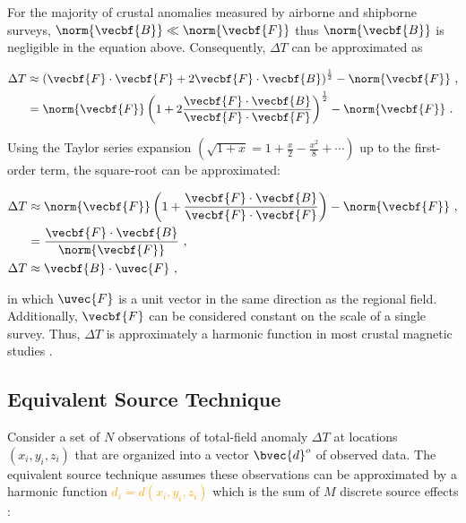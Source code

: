 \noindent
For the majority of crustal anomalies measured by airborne and shipborne surveys, $\norm{\vecbf{B}} \ll \norm{\vecbf{F}}$ thus $\norm{\vecbf{B}}$ is negligible in the equation above. Consequently, $\Delta T$ can be approximated as \citep{Blakley1995}

\begin{align}
    \Delta T &\approx \left(
        \vecbf{F} \cdot \vecbf{F}
        + 2\vecbf{F} \cdot \vecbf{B}
    \right)^{\frac{1}{2}}
    - \norm{\vecbf{F}} \ ,
    \\
    &= \norm{\vecbf{F}} \left(
        1 + 2 \dfrac{
            \vecbf{F} \cdot \vecbf{B}
        }{
            \vecbf{F} \cdot \vecbf{F}
        }
    \right)^{\frac{1}{2}}
    - \norm{\vecbf{F}} \ .
    \label{eq:}
\end{align}

\noindent
Using the Taylor series expansion $\left( \sqrt{1 + x} = 1 + \frac{x}{2} - \frac{x^2}{8} + \cdots \right)$ up to the first-order term, the square-root can be approximated:

\begin{align}
    \Delta T & \approx \norm{\vecbf{F}} \left(
        1 + \dfrac{
            \vecbf{F} \cdot \vecbf{B}
        }{
            \vecbf{F} \cdot \vecbf{F}
        }
    \right)
    - \norm{\vecbf{F}} \ ,
    \\
    &=
    \dfrac{\vecbf{F} \cdot \vecbf{B}}{\norm{\vecbf{F}}} \ ,
    \\
\label{eq:tfa_dot_product}
    \Delta T & \approx \vecbf{B} \cdot \uvec{F}
    \ ,
\end{align}

\noindent
in which $\uvec{F}$ is a unit vector in the same direction as the regional field. Additionally, $\vecbf{F}$ can be considered constant on the scale of a single survey. Thus, $\Delta T$ is approximately a harmonic function in most crustal magnetic studies \citep{Blakley1995,OliveiraJr2015}.


\subsection{Equivalent Source Technique}

Consider a set of $N$ observations of total-field anomaly $\Delta T$ at locations $(x_i, y_i, z_i)$ that are organized into a vector $\bvec{d}^o$ of observed data. The equivalent source technique assumes these observations can be approximated by a harmonic function \textcolor{orange}{$d_i = d(x_i, y_i, z_i)$} which is the sum of $M$ discrete source effects \citep{Dampney1969, Cordell1992}:

